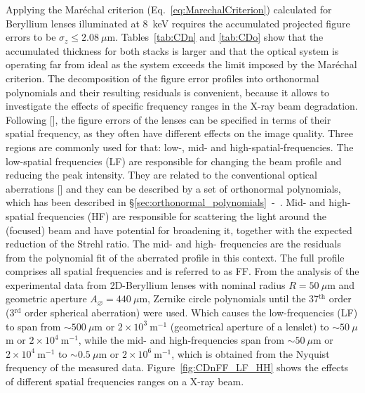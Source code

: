 \begin{refsection}
Applying the Mar\'echal criterion (Eq.~\ref{eq:MarechalCriterion}) calculated for Beryllium lenses illuminated at 8~keV requires the accumulated projected figure errors to be $\sigma_z\leq2.08~\mu\text{m}$. Tables~\ref{tab:CDn} and \ref{tab:CDo} show that the accumulated thickness for both stacks is larger and that the optical system is operating far from ideal as the system exceeds the limit imposed by the Mar\'echal criterion. The decomposition of the figure error profiles into orthonormal polynomials and their resulting residuals is convenient, because it allows to investigate the effects of specific frequency ranges in the X-ray beam degradation. Following [\cite{Harvey1995a}], the figure errors of the lenses can be specified in terms of their spatial frequency, as they often have different effects on the image quality. Three regions are commonly used for that: low-, mid- and high-spatial-frequencies. The low-spatial frequencies (LF) are responsible for changing the beam profile and reducing the peak intensity. They are related to the conventional optical aberrations [\cite[\textit{\S9.1-3}]{born_wolf1999}] and they can be described by a set of orthonormal polynomials, which has been described in \S\ref{sec:orthonormal_polynomials}~-~\textit{}. Mid- and high-spatial frequencies (HF) are responsible for scattering the light around the (focused) beam and have potential for broadening it, together with the expected reduction of the Strehl ratio. The mid- and high- frequencies are the residuals from the polynomial fit of the aberrated profile in this context. The full profile comprises all spatial frequencies and is referred to as FF. From the analysis of the experimental data from 2D-Beryllium lenses with nominal radius $R=50~\mu\text{m}$ and geometric aperture $A_{\diameter}=440~\mu\text{m}$, Zernike circle polynomials until the 37$^\text{th}$ order (3$^\text{rd}$ order spherical aberration) were used. Which causes the low-frequencies (LF) to span from $\sim500~\mu$m or $2\times10^{3}~\text{m}^{-1}$ (geometrical aperture of a lenslet) to $\sim50~\mu$m or $2\times10^{4}~\text{m}^{-1}$, while the mid- and high-frequencies span from $\sim50~\mu$m or $2\times10^{4}~\text{m}^{-1}$ to $\sim0.5~\mu$m or $2\times10^{6}~\text{m}^{-1}$, which is obtained from the Nyquist frequency of the measured data. Figure~\ref{fig:CDnFF_LF_HH} shows the effects of different spatial frequencies ranges on a X-ray beam. 


\end{refsection}
